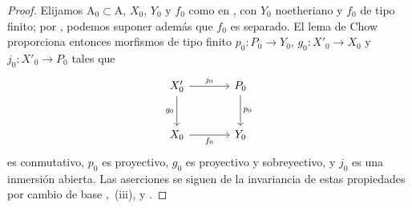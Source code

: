 \begin{proof}
Elijamos $\mathrm{A}_0\subset\mathrm{A}$, $X_0$, $Y_0$ y $f_0$ como en , con $Y_0$ noetheriano y $f_0$ de tipo finito; por , podemos suponer además que $f_0$ es separado. El lema de Chow  proporciona entonces morfismos de tipo finito $p_0:P_0\to Y_0$, $g_0:X'_0\to X_0$ y $j_0:X'_0\to P_0$ tales que
\[
\begin{tikzcd}[column sep=large,row sep=large]
X'_0 \arrow[r,"j_0"] \arrow[d,"g_0"'] & P_0 \arrow[d,"p_0"] \\
X_0 \arrow[r,"f_0"'] & Y_0
\end{tikzcd}
\]
es conmutativo, $p_0$ es proyectivo, $g_0$ es proyectivo y sobreyectivo, y $j_0$ es una inmersión abierta. Las aserciones se siguen de la invariancia de estas propiedades por cambio de base ,~(iii),  y .
\end{proof}

